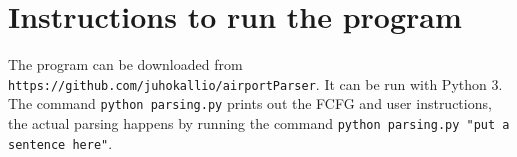 \documentclass[finnish]{article}
\begin{document}
\section{Instructions to run the program}
The program can be downloaded from \texttt{https://github.com/juhokallio/airportParser}. It can be run with Python 3. The command \texttt{python parsing.py} prints out the FCFG and user instructions, the actual parsing happens by running the command \texttt{python parsing.py "put a sentence here"}.
\end{document}
